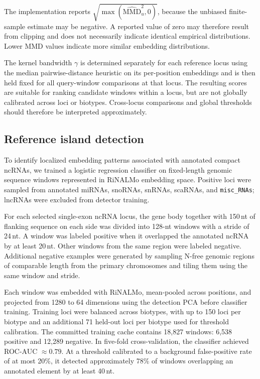 The implementation reports
$\sqrt{\max(\widehat{\mathrm{MMD}}_u^2, 0)}$, because the unbiased finite-sample
estimate may be negative. A reported value of zero may therefore result from
clipping and does not necessarily indicate identical empirical distributions.
Lower MMD values indicate more similar embedding distributions.

The kernel bandwidth $\gamma$ is determined separately for each reference locus
using the median pairwise-distance heuristic on its per-position embeddings and
is then held fixed for all query-window comparisons at that locus. The resulting
scores are suitable for ranking candidate windows within a locus, but are not
globally calibrated across loci or biotypes. Cross-locus comparisons and global
thresholds should therefore be interpreted approximately.

\subsection{Reference island detection}
\label{sec:refisland}

To identify localized embedding patterns associated with annotated compact
ncRNAs, we trained a logistic regression classifier on fixed-length genomic
sequence windows represented in RiNALMo embedding space. Positive loci were
sampled from annotated miRNAs, snoRNAs, snRNAs, scaRNAs, and
\texttt{misc\_RNAs}; lncRNAs were excluded from detector training.

For each selected single-exon ncRNA locus, the gene body together with
150\,nt of flanking sequence on each side was divided into 128-nt windows with
a stride of 24\,nt. A window was labeled positive when it overlapped the
annotated ncRNA by at least 20\,nt. Other windows from the same region were
labeled negative. Additional negative examples were generated by sampling N-free genomic regions
of comparable length from the primary chromosomes and tiling them using the same
window and stride.

Each window was embedded with RiNALMo, mean-pooled across positions, and
projected from 1280 to 64 dimensions using the detection PCA before classifier
training. Training loci were balanced across biotypes, with up to 150 loci per
biotype and an additional 71 held-out loci per biotype used for threshold
calibration. The committed training cache contains 18{,}827 windows:
6{,}538 positive and 12{,}289 negative. In five-fold cross-validation, the
classifier achieved ROC-AUC $\approx 0.79$. At a threshold calibrated to a
background false-positive rate of at most 20\%, it detected approximately 78\%
of windows overlapping an annotated element by at least 40\,nt.

